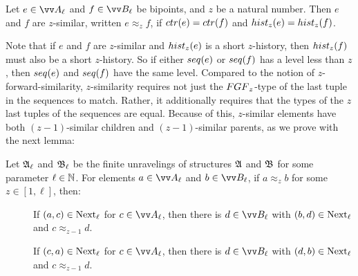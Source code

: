 \begin{definition}
 Let $e \in \unraveldom{A}_{\ell}$ and $f \in \unraveldom{B}_{\ell}$ be bipoints, and $z$ be a natural number. Then $e$ and $f$ are $z$-similar, written $e \approx_{z} f$, if $\ctr{e} = \ctr{f}$ and $\hist{z}{e} = \hist{z}{f}$.
\end{definition}
Note that if $e$ and $f$ are $z$-similar and $\hist{z}{e}$ is a short $z$-history, then $\hist{z}{f}$ must also be a short $z$-history.
So if either $\seq{e}$ or $\seq{f}$ has a level less than $z$, then $\seq{e}$ and $\seq{f}$ have the same level.
Compared to the notion of $z$-forward-similarity, $z$-similarity requires not just the $\FGF_{z}$-type of the last tuple in the sequences to match.
Rather, it additionally requires that the types of the $z$ last tuples of the sequences are equal.
Because of this, $z$-similar elements have both $(z{-}1)$-similar children and $(z{-}1)$-similar parents, as we prove with the next lemma:
\begin{lemma}\label{lem:approx-next}
  Let ${\mathfrak{A}}_{\ell}$ and ${\mathfrak{B}}_{\ell}$ be the finite unravelings of structures ${\mathfrak{A}}$ and ${\mathfrak{B}}$ for some parameter $\ell \in {\mathbb{N}}$.
  For elements $a \in \unraveldom{A}_{\ell}$ and $b \in \unraveldom{B}_{\ell}$, if $a \approx_{z} b$ for some $z \in [1,\ell]$, then:
  \begin{description}
    \item[] If $(a, c) \in \mathrm{Next}_{\ell}$ for $c \in \unraveldom{A}_{\ell}$, then there is $d \in \unraveldom{B}_{\ell}$ with $(b, d) \in \mathrm{Next}_{\ell}$ and $c \approx_{z-1} d$.
    \item[] If $(c, a) \in \mathrm{Next}_{\ell}$ for $c \in \unraveldom{A}_{\ell}$, then there is $d \in \unraveldom{B}_{\ell}$ with $(d, b) \in \mathrm{Next}_{\ell}$ and $c \approx_{z-1} d$.
  \end{description}
\end{lemma}
